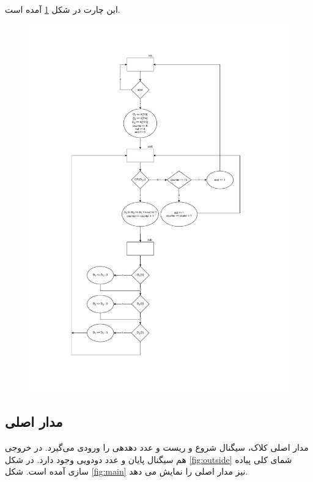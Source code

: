 \documentclass{article}
\begin{document}
این چارت در شکل \ref{fig:asm} آمده است.

\begin{figure}
	\centering
	\includegraphics[scale=0.45]{./graphics/asm}
	\caption{}
	\label{fig:asm}
\end{figure}

\subsection{مدار اصلی}
مدار اصلی کلاک، سیگنال شروع و ریست و عدد دهدهی را ورودی می‌گیرد. در خروجی هم سیگنال پایان و عدد دودویی وجود دارد. در شکل \ref{fig:outside} شمای کلی پیاده سازی آمده است. شکل \ref{fig:main} نیز مدار اصلی را نمایش می دهد.
\end{document}
